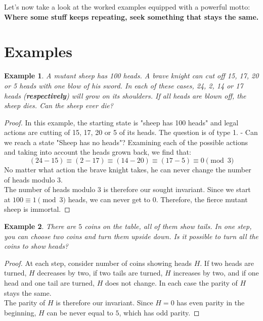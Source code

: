 \documentclass[11pt,a5paper]{article}
\newtheorem{theorem}{Example}
\begin{document}
\noindent Let's now take a look at the worked examples equipped with a powerful motto: \textbf{Where some stuff keeps repeating, seek something that stays the same.}

\section{Examples}
\begin{theorem}
	A mutant sheep has 100 heads. A brave knight can cut off 15, 17, 20 or 5 heads with one blow of his sword. In each of these cases, 24, 2, 14 or 17 heads (\textbf{respectively}) will grow on its shoulders. If all heads are blown off, the sheep dies. Can the sheep ever die?
\end{theorem}
\begin{proof}
	In this example, the starting state is "sheep has 100 heads" and legal actions are cutting of 15, 17, 20 or 5 of its heads. The question is of type 1. - Can we reach a state "Sheep has no heads"?
	Examining each of the possible actions and taking into account the heads grown back, we find that:
	\[(24 - 15) \equiv (2 - 17) \equiv (14 - 20) \equiv (17 - 5) \equiv 0 \pmod 3\]
No matter what action the brave knight takes, he can never change the number of heads modulo $3$. \\
The number of heads modulo $3$ is therefore our sought invariant. Since we start at $100 \equiv 1 \pmod 3$ heads, we can never get to $0$. Therefore, the fierce mutant sheep is immortal.
\end{proof}

\begin{theorem}
	There are $5$ coins on the table, all of them show tails. In one step, you can choose two coins and turn them upside down. Is it possible to turn all the coins to show heads?
\end{theorem}	
\begin{proof}
At each step, consider number of coins showing heads $H$. If two heads are turned, $H$ decreases by two, if two tails are turned, $H$ increases by two, and if one head and one tail are turned, $H$ does not change. In each case the parity of $H$ stays the same. \\
The parity of $H$ is therefore our invariant. Since $H = 0$ has even parity in the beginning, $H$ can be never equal to $5$, which has odd parity.
\end{proof}
\end{document}
